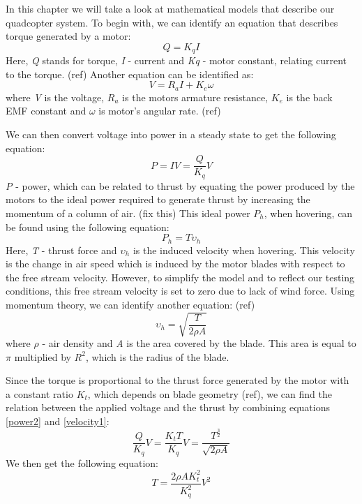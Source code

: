 In this chapter we will take a look at mathematical models that describe our quadcopter system.
To begin with, we can identify an equation that describes torque generated by a motor:
\begin{equation}
\label{torque1}
	Q = K_qI
\end{equation}
Here, \textit{Q} stands for torque, \textit{I} - current and \textit{Kq} - motor constant, relating current to the torque. (ref)
Another equation can be identified as:
\begin{equation}
\label{voltage1}
	V = R_aI + K_e\omega
\end{equation}
where \textit{V} is the voltage, \textit{$R_a$} is the motors armature resistance, \textit{$K_e$} is the back EMF constant and \textit{$\omega$} is motor's angular rate. (ref)

We can then convert voltage into power in a steady state to get the following equation:
\begin{equation}
\label{power1}
	P = IV = \frac{Q}{K_q}V
\end{equation}
\textit{P} - power, which can be related to thrust by equating the power produced by the motors to the ideal power required to generate thrust by increasing the momentum of a column of air. (fix this) This ideal power \textit{$P_h$}, when hovering, can be found using the following equation:
\begin{equation}
\label{power2}
	P_h = T\upsilon_h
\end{equation}
Here, \textit{T} - thrust force and \textit{$\upsilon_h$} is the induced velocity when hovering. This velocity is the change in air speed which is induced by the motor blades with respect to the free stream velocity. However, to simplify the model and to reflect our testing conditions, this free stream velocity is set to zero due to lack of wind force.
Using momentum theory, we can identify another equation: (ref)
\begin{equation}
\label{velocity1}
	\upsilon_h = \sqrt{\frac{T}{2\rho A}}
\end{equation}
where \textit{$\rho$} - air density and \textit{A} is the area covered by the blade. This area is equal to $\pi$ multiplied by $R^2$, which is the radius of the blade.

Since the torque is proportional to the thrust force generated by the motor with a constant ratio \textit{$K_t$}, which depends on blade geometry (ref), we can find the relation between the applied voltage and the thrust by combining equations \ref{power2} and \ref{velocity1}:
\begin{equation}
\label{voltage2}
	\frac{Q}{K_q}V = \frac{K_tT}{K_q}V = \frac{T^\frac{3}{2}}{\sqrt{2\rho A}}
\end{equation}
We then get the following equation:
\begin{equation}
\label{thrust1}
	T = \frac{2\rho AK_t^2}{K_q^2}V^2
\end{equation}